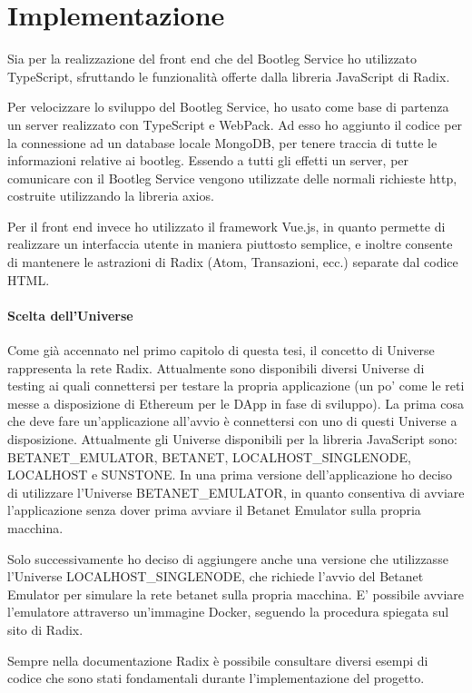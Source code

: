 \chapter{Implementazione}
Sia per la realizzazione del front end che del Bootleg Service ho utilizzato TypeScript, sfruttando le funzionalità offerte dalla libreria JavaScript di Radix. 

Per velocizzare lo sviluppo del Bootleg Service, ho usato come base di partenza un server realizzato con TypeScript e WebPack. Ad esso ho aggiunto il codice per la connessione ad un database locale MongoDB, per tenere traccia di tutte le informazioni relative ai bootleg. Essendo a tutti gli effetti un server, per comunicare con il Bootleg Service vengono utilizzate delle normali richieste http, costruite utilizzando la libreria axios.

Per il front end invece ho utilizzato il framework Vue.js, in quanto permette di realizzare un interfaccia utente in maniera piuttosto semplice, e inoltre consente di mantenere le astrazioni di Radix (Atom, Transazioni, ecc.) separate dal codice HTML.

\subsubsection{Scelta dell'Universe}

Come già accennato nel primo capitolo di questa tesi, il concetto di Universe rappresenta la rete Radix. Attualmente sono disponibili diversi Universe di testing ai quali connettersi per testare la propria applicazione (un po' come le reti messe a disposizione di Ethereum per le DApp in fase di sviluppo). La prima cosa che deve fare un'applicazione all'avvio è connettersi con uno di questi Universe a disposizione. Attualmente gli Universe disponibili per la libreria JavaScript sono: BETANET_EMULATOR, BETANET, LOCALHOST_SINGLENODE, LOCALHOST e SUNSTONE. In una prima versione dell'applicazione ho deciso di utilizzare l'Universe BETANET_EMULATOR, in quanto consentiva di avviare l'applicazione senza dover prima avviare il Betanet Emulator sulla propria macchina. 

Solo successivamente ho deciso di aggiungere anche una versione che utilizzasse l'Universe LOCALHOST_SINGLENODE, che richiede l'avvio del Betanet Emulator per simulare la rete betanet sulla propria macchina. E' possibile avviare l'emulatore attraverso un'immagine Docker, seguendo la procedura spiegata sul sito di Radix.

Sempre nella documentazione Radix è possibile consultare diversi esempi di codice che sono stati fondamentali durante l'implementazione del progetto.

